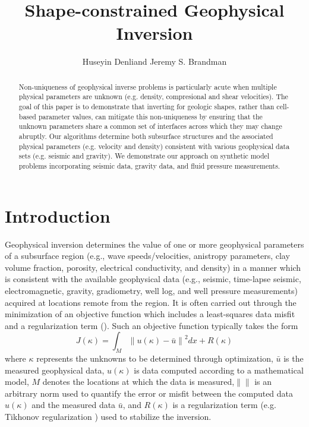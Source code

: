 \documentclass[manuscript,revised]{geophysics}
\newcommand\norm[1]{\left\lVert#1\right\rVert}
\begin{document}
\title{Shape-constrained Geophysical Inversion}

\renewcommand{\thefootnote}{\fnsymbol{footnote}} 

\address{
\footnotemark[1] ExxonMobil Research \& Engineering Company, \\
1545 Route 22E, Annandale, NJ 08801}
\author{Huseyin Denli\footnotemark[1] and Jeremy S. Brandman\footnotemark[1]}

\maketitle

\begin{abstract}
Non-uniqueness of geophysical inverse problems is particularly acute when multiple physical parameters are unknown (e.g. density, compresional and shear velocities). The goal of this paper is to demonstrate that inverting for geologic shapes, rather than cell-based parameter values, can mitigate this non-uniqueness by ensuring that the unknown parameters share a common set of interfaces across which they may change abruptly. Our algorithms determine both subsurface structures and the associated physical parameters (e.g. velocity and density) consistent with various geophysical data sets (e.g. seismic and gravity).  We demonstrate our approach on synthetic model problems incorporating seismic data, gravity data, and fluid pressure measurements. 
\end{abstract}

\section{Introduction}
Geophysical inversion determines the value of one or more geophysical parameters of a subsurface region (e.g., wave speeds/velocities, anistropy parameters, clay volume fraction, porosity, electrical conductivity, and density) in a manner which is consistent with the available geophysical data (e.g., seismic, time-lapse seismic, electromagnetic, gravity, gradiometry, well log, and well pressure measurements)  acquired at locations remote from the region.  It is often carried out through the minimization of an objective function which includes a least-squares data misfit and a regularization term (\cite{Parker_1994}). Such an objective function typically takes the form
\begin{equation} \label{eq:objective}
J\left(\kappa\right) = \int_M \norm{u(\kappa)-\bar{u}}^2  dx + R\left(\kappa\right)
\end{equation}
where $\kappa$ represents the unknowns to be determined through optimization, $\bar{u}$ is the measured geophysical data, $u(\kappa)$ is data computed according to a mathematical model, $M$ denotes the locations at which the data is measured,$\norm{}$ is an arbitrary norm used to quantify the error or misfit between the computed data $u(\kappa)$ and the measured data $\bar{u}$, and $R\left(\kappa\right)$ is a regularization term (e.g. Tikhonov regularization ) used to stabilize the inversion. 
\end{document}
